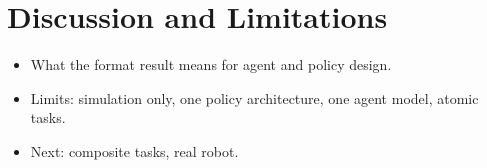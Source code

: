 \section{Discussion and Limitations}
\label{sec:discussion}


\begin{itemize}
  \item What the format result means for agent and policy design.
  \item Limits: simulation only, one policy architecture, one agent model, atomic tasks.
  \item Next: composite tasks, real robot.
\end{itemize}
